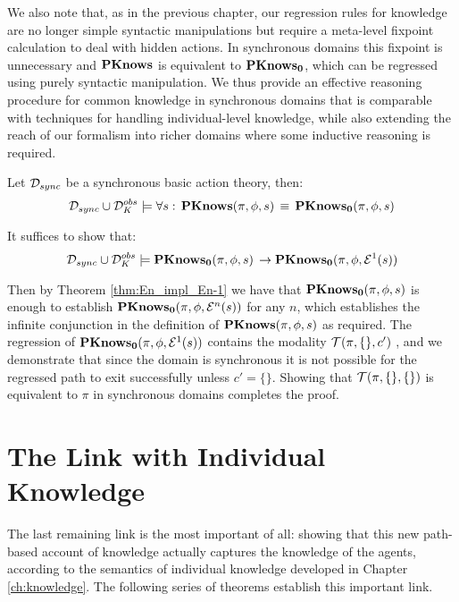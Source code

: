 We also note that, as in the previous chapter, our regression rules
for knowledge are no longer simple syntactic manipulations but require
a meta-level fixpoint calculation to deal with hidden actions. In
synchronous domains this fixpoint is unnecessary and $\mathbf{PKnows}$ is
equivalent to $\mathbf{PKnows_{0}}$, which can be regressed using purely syntactic
manipulation. We thus provide an effective reasoning procedure for
common knowledge in synchronous domains that is comparable with techniques
for handling individual-level knowledge, while also extending the
reach of our formalism into richer domains where some inductive reasoning
is required.

\begin{thm}
Let $\mathcal{D}_{sync}$ be a synchronous basic action theory, then:\label{thm:Sync-PKnows-PKnowsZ}\[
\mathcal{D}_{sync}\cup\mathcal{D}_{K}^{obs}\models\forall s:\,\mathbf{PKnows}(\pi,\phi,s)\,\equiv\,\mathbf{PKnows_{0}}(\pi,\phi,s)\]

\end{thm}
\begin{proofsketch}
It suffices to show that:\[
\mathcal{D}_{sync}\cup\mathcal{D}_{K}^{obs}\models\mathbf{PKnows_{0}}(\pi,\phi,s)\,\rightarrow\mathbf{PKnows_{0}}(\pi,\phi,\mathcal{E}^{1}(s))\]


Then by Theorem \ref{thm:En_impl_En-1} we have that $\mathbf{PKnows_{0}}(\pi,\phi,s)$
is enough to establish $\mathbf{PKnows_{0}}(\pi,\phi,\mathcal{E}^{n}(s))$ for
any $n$, which establishes the infinite conjunction in the definition
of $\mathbf{PKnows}(\pi,\phi,s)$ as required. The regression of $\mathbf{PKnows_{0}}(\pi,\phi,\mathcal{E}^{1}(s))$
contains the modality $\mathcal{T}(\pi,\{\},c')$ , and we demonstrate that
since the domain is synchronous it is not possible for the regressed
path to exit successfully unless $c'=\{\}$. Showing that $\mathcal{T}(\pi,\{\},\{\})$
is equivalent to $\pi$ in synchronous domains completes the proof. 
\end{proofsketch}

\section{The Link with Individual Knowledge\label{sec:CKnowledge:Correctness}}

The last remaining link is the most important of all: showing that
this new path-based account of knowledge actually captures the knowledge
of the agents, according to the semantics of individual knowledge
developed in Chapter \ref{ch:knowledge}. The following series of
theorems establish this important link.

